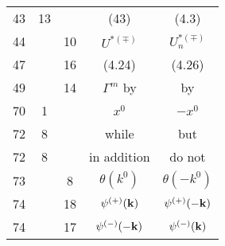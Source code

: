 \documentclass[a4paper,11pt]{article}
\begin{document}
\begin{center}
\begin{tabular}{|c|c|c|c|c|}
    43 & 13 & & (43) & (4.3) \\
    44 & & 10 & $U^{ *( \mp ) }$ & $U_{ n }^{ *( \mp ) }$ \\
    47 & & 16 & (4.24) & (4.26) \\
    49 & & 14 & $\Gamma^{ m }$ by & by \\
    70 & 1 & & $x^{ 0 }$ & $-x^{ 0 }$ \\
    72 & 8 & & while & but \\
    72 & 8 & & in addition & do not \\
    73 & & 8 & $\theta( k^{ 0 } )$ & $\theta( -k^{ 0 } )$ \\
    74 & & 18 & $\psi^{ ( + ) }( \mathbf{k} )$
           & $\psi^{ ( + ) }( -\mathbf{k} )$ \\
    74 & & 17 & $\psi^{ ( - ) }( -\mathbf{k} )$
           & $\psi^{ ( - ) }( \mathbf{k} )$ \\
    \hline
  \end{tabular}

\end{center}


\vspace{\spaceTwo}

















\end{document}
